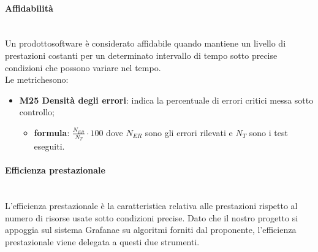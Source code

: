 	\paragraph{Affidabilità} \mbox{}\\[1mm]
	Un prodotto\glosp software è considerato affidabile quando mantiene un livello di prestazioni costanti per un determinato intervallo di tempo sotto precise condizioni che possono variare nel tempo.\\
	Le metriche\glosp sono:
	\begin{itemize}
		\item \textbf{M25 Densità degli errori}: indica la percentuale di errori critici messa sotto controllo; 
		\begin{itemize}
			\item[] \textbf{formula}: $\frac{N_{ER}}{N_{T}}\cdot100$ dove $N_{ER}$ sono gli errori rilevati e $N_T$ sono i test eseguiti.
		\end{itemize}
	\end{itemize}

	\paragraph{Efficienza prestazionale} \mbox{}\\
	L'efficienza prestazionale è la caratteristica relativa alle prestazioni rispetto al numero di risorse usate sotto condizioni precise. Dato che il nostro progetto si appoggia sul sistema Grafana\glosp e su algoritmi forniti dal proponente, l'efficienza prestazionale viene delegata a questi due strumenti.
		
